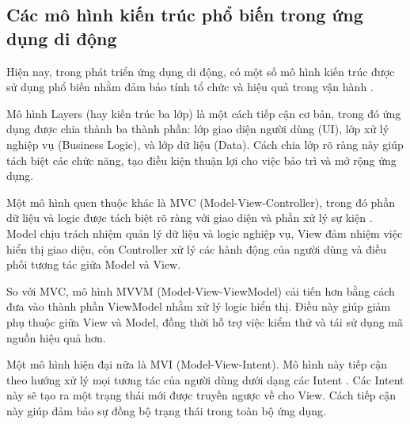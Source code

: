     \subsection{Các mô hình kiến trúc phổ biến trong ứng dụng di động}
    \renewcommand{\labelitemi}{--}
    \begin{flushleft}
        \hspace*{0.8cm}Hiện nay, trong phát triển ứng dụng di động, có một số mô hình kiến trúc được sử dụng phổ biến nhằm đảm bảo tính tổ chức và hiệu quả trong vận hành \cite{mvvm}.
    \end{flushleft}

    \begin{flushleft}
        \hspace*{0.8cm}Mô hình Layers (hay kiến trúc ba lớp) là một cách tiếp cận cơ bản, trong đó ứng dụng được chia thành ba thành phần: lớp giao diện người dùng (UI), lớp xử lý nghiệp vụ (Business Logic), và lớp dữ liệu (Data). Cách chia lớp rõ ràng này giúp tách biệt các chức năng, tạo điều kiện thuận lợi cho việc bảo trì và mở rộng ứng dụng.
      \end{flushleft}

      \begin{flushleft}
        \hspace*{0.8cm}Một mô hình quen thuộc khác là MVC (Model-View-Controller), trong đó phần dữ liệu và logic được tách biệt rõ ràng với giao diện và phần xử lý sự kiện \cite{mvvm}. Model chịu trách nhiệm quản lý dữ liệu và logic nghiệp vụ, View đảm nhiệm việc hiển thị giao diện, còn Controller xử lý các hành động của người dùng và điều phối tương tác giữa Model và View.
      \end{flushleft}

      \begin{flushleft}
        \hspace*{0.8cm}So với MVC, mô hình MVVM (Model-View-ViewModel) cải tiến hơn bằng cách đưa vào thành phần ViewModel nhằm xử lý logic hiển thị. Điều này giúp giảm phụ thuộc giữa View và Model, đồng thời hỗ trợ việc kiểm thử và tái sử dụng mã nguồn hiệu quả hơn.
      \end{flushleft}

      \begin{flushleft}
        \hspace*{0.8cm}Một mô hình hiện đại nữa là MVI (Model-View-Intent). Mô hình này tiếp cận theo hướng xử lý mọi tương tác của người dùng dưới dạng các Intent \cite{mvvm}. Các Intent này sẽ tạo ra một trạng thái mới được truyền ngược về cho View. Cách tiếp cận này giúp đảm bảo sự đồng bộ trạng thái trong toàn bộ ứng dụng.
      \end{flushleft}

